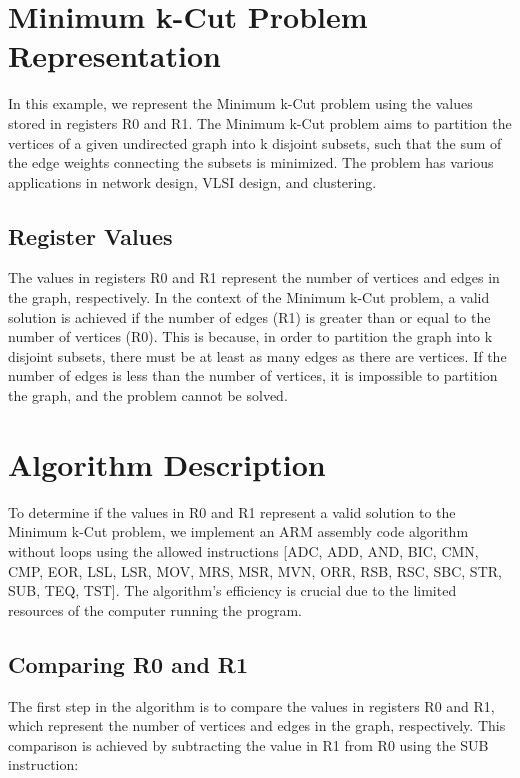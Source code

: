 \section{Minimum k-Cut Problem Representation}

In this example, we represent the Minimum k-Cut problem using the values stored in registers R0 and R1. The Minimum k-Cut problem aims to partition the vertices of a given undirected graph into k disjoint subsets, such that the sum of the edge weights connecting the subsets is minimized. The problem has various applications in network design, VLSI design, and clustering.

\subsection{Register Values}

The values in registers R0 and R1 represent the number of vertices and edges in the graph, respectively. In the context of the Minimum k-Cut problem, a valid solution is achieved if the number of edges (R1) is greater than or equal to the number of vertices (R0). This is because, in order to partition the graph into k disjoint subsets, there must be at least as many edges as there are vertices. If the number of edges is less than the number of vertices, it is impossible to partition the graph, and the problem cannot be solved.

\section{Algorithm Description}

To determine if the values in R0 and R1 represent a valid solution to the Minimum k-Cut problem, we implement an ARM assembly code algorithm without loops using the allowed instructions [ADC, ADD, AND, BIC, CMN, CMP, EOR, LSL, LSR, MOV, MRS, MSR, MVN, ORR, RSB, RSC, SBC, STR, SUB, TEQ, TST]. The algorithm's efficiency is crucial due to the limited resources of the computer running the program.

\subsection{Comparing R0 and R1}

The first step in the algorithm is to compare the values in registers R0 and R1, which represent the number of vertices and edges in the graph, respectively. This comparison is achieved by subtracting the value in R1 from R0 using the SUB instruction:

